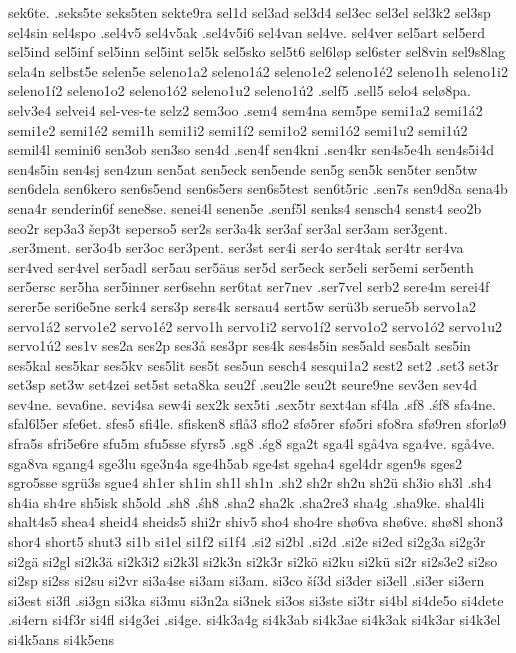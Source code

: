 {{sek6te.
.seks5te
seks5ten
sekte9ra
sel1d
sel3ad
sel3d4
sel3ec
sel3el
sel3k2
sel3sp
sel4sin
sel4spo
.sel4v5
sel4v5ak
.sel4v5i6
sel4van
sel4ve.
sel4ver
sel5art
sel5erd
sel5ind
sel5inf
sel5inn
sel5int
sel5k
sel5sko
sel5t6
sel6løp
sel6ster
sel8vin
sel9s8lag
sela4n
selbst5e
selen5e
seleno1a2
seleno1á2
seleno1e2
seleno1é2
seleno1h
seleno1i2
seleno1í2
seleno1o2
seleno1ó2
seleno1u2
seleno1ú2
.self5
.sell5
selo4
selø8pa.
selv3e4
selvei4
sel-ves-te
selz2
sem3oo
.sem4
sem4na
sem5pe
semi1a2
semi1á2
semi1e2
semi1é2
semi1h
semi1i2
semi1í2
semi1o2
semi1ó2
semi1u2
semi1ú2
semil4l
semini6
sen3ob
sen3so
sen4d
.sen4f
sen4kni
.sen4kr
sen4s5e4h
sen4s5i4d
sen4s5in
sen4sj
sen4zun
sen5at
sen5eck
sen5ende
sen5g
sen5k
sen5ter
sen5tw
sen6dela
sen6kero
sen6s5end
sen6s5ers
sen6s5test
sen6t5ric
.sen7s
sen9d8a
sena4b
sena4r
senderin6f
sene8se.
senei4l
senen5e
.senf5l
senks4
sensch4
senst4
seo2b
seo2r
sep3a3
šep3t
seperso5
ser2s
ser3a4k
ser3af
ser3al
ser3am
ser3gent.
.ser3ment.
ser3o4b
ser3oc
ser3pent.
ser3st
ser4i
ser4o
ser4tak
ser4tr
ser4va
ser4ved
ser4vel
ser5adl
ser5au
ser5äus
ser5d
ser5eck
ser5eli
ser5emi
ser5enth
ser5ersc
ser5ha
ser5inner
ser6sehn
ser6tat
ser7nev
.ser7vel
serb2
sere4m
serei4f
serer5e
seri6e5ne
serk4
sers3p
sers4k
sersau4
sert5w
serü3b
serue5b
servo1a2
servo1á2
servo1e2
servo1é2
servo1h
servo1i2
servo1í2
servo1o2
servo1ó2
servo1u2
servo1ú2
ses1v
ses2a
ses2p
ses3å
ses3pr
ses4k
ses4s5in
ses5ald
ses5alt
ses5in
ses5kal
ses5kar
ses5kv
ses5lit
ses5t
ses5un
sesch4
sesqui1a2
sest2
set2
.set3
set3r
set3sp
set3w
set4zei
set5st
seta8ka
seu2f
.seu2le
seu2t
seure9ne
sev3en
sev4d
sev4ne.
seva6ne.
sevi4sa
sew4i
sex2k
sex5ti
.sex5tr
sext4an
sf4la
.sf8
.śf8
sfa4ne.
sfal6l5er
sfe6et.
sfes5
sfi4le.
sfisken8
sflå3
sflo2
sfø5rer
sfø5ri
sfo8ra
sfø9ren
sforlø9
sfra5s
sfri5e6re
sfu5m
sfu5sse
sfyrs5
.sg8
.śg8
sga2t
sga4l
sgå4va
sga4ve.
sgå4ve.
sga8va
sgang4
sge3lu
sge3n4a
sge4h5ab
sge4st
sgeha4
sgel4dr
sgen9s
sges2
sgro5sse
sgrü3s
sgue4
sh1er
sh1in
sh1l
sh1n
.sh2
sh2r
sh2u
sh2ü
sh3io
sh3l
.sh4
sh4ia
sh4re
sh5isk
sh5old
.sh8
.śh8
.sha2
sha2k
.sha2re3
sha4g
.sha9ke.
shal4li
shalt4s5
shea4
sheid4
sheids5
shi2r
shiv5
sho4
sho4re
shø6va
shø6ve.
shø8l
shon3
shor4
short5
shut3
si1b
si1el
si1f2
si1f4
.si2
si2bl
.si2d
.si2e
si2ed
si2g3a
si2g3r
si2gä
si2gl
si2k3ä
si2k3i2
si2k3l
si2k3n
si2k3r
si2kö
si2ku
si2kü
si2r
si2s3e2
si2so
si2sp
si2ss
si2su
si2vr
si3a4se
si3am
si3am.
si3co
ší3d
si3der
si3ell
.si3er
si3ern
si3est
si3fl
.si3gn
si3ka
si3mu
si3n2a
si3nek
si3os
si3ste
si3tr
si4bl
si4de5o
si4dete
.si4ern
si4f3r
si4fl
si4g3ei
.si4ge.
si4k3a4g
si4k3ab
si4k3ae
si4k3ak
si4k3ar
si4k3el
si4k5ans
si4k5ens
}}
